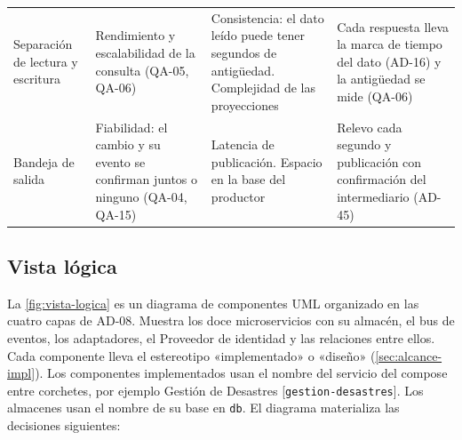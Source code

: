 \documentclass[11pt,letterpaper]{article}
\providecommand{\br}{\discretionary{}{}{}}
\begin{document}
\begin{longtable}{L{2.6cm} L{4.0cm} L{4.0cm} L{5.2cm}}
Separación de lectura y escritura & Rendimiento y escalabilidad de la consulta (QA-05, QA-06) &
Consistencia: el dato leído puede tener segundos de antigüedad. Complejidad de las proyecciones &
Cada respuesta lleva la marca de tiempo del dato (AD-16) y la antigüedad se mide (QA-06) \\
Bandeja de salida & Fiabilidad: el cambio y su evento se confirman juntos o ninguno (QA-04, QA-15)
& Latencia de publicación. Espacio en la base del productor & Relevo cada segundo y publicación con
confirmación del intermediario (AD-45) \\
\end{longtable}

\subsection{Vista lógica}
\label{sec:vista-logica}

La \cref{fig:vista-logica} es un diagrama de componentes UML organizado en las cuatro capas de
AD-08. Muestra los doce microservicios con su almacén, el bus de eventos, los adaptadores, el
Proveedor de identidad y las relaciones entre ellos. Cada componente lleva el estereotipo
«implementado» o «diseño» (\cref{sec:alcance-impl}). Los componentes implementados usan el nombre
del servicio del compose entre corchetes, por ejemplo Gestión de Desastres
[\texttt{gestion-\br{}desastres}]. Los almacenes usan el nombre de su base en \texttt{db}. El
diagrama materializa las decisiones siguientes:
\end{document}
